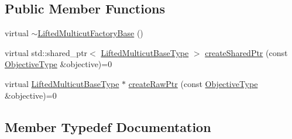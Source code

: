 \subsection*{Public Member Functions}
\begin{DoxyCompactItemize}
\item 
virtual \hyperlink{classnifty_1_1graph_1_1optimization_1_1lifted__multicut_1_1LiftedMulticutFactoryBase_a39b5ed3271c1891e6c959cf0d13b3a44}{$\sim$\+Lifted\+Multicut\+Factory\+Base} ()
\item 
virtual std\+::shared\+\_\+ptr$<$ \hyperlink{classnifty_1_1graph_1_1optimization_1_1lifted__multicut_1_1LiftedMulticutFactoryBase_adbe8507647f54608c03ce04b42742414}{Lifted\+Multicut\+Base\+Type} $>$ \hyperlink{classnifty_1_1graph_1_1optimization_1_1lifted__multicut_1_1LiftedMulticutFactoryBase_a96b3ee71a961471371c92be56d25de16}{create\+Shared\+Ptr} (const \hyperlink{classnifty_1_1graph_1_1optimization_1_1lifted__multicut_1_1LiftedMulticutFactoryBase_a25e776473243feba756c4998e89c35f0}{Objective\+Type} \&objective)=0
\item 
virtual \hyperlink{classnifty_1_1graph_1_1optimization_1_1lifted__multicut_1_1LiftedMulticutFactoryBase_adbe8507647f54608c03ce04b42742414}{Lifted\+Multicut\+Base\+Type} $\ast$ \hyperlink{classnifty_1_1graph_1_1optimization_1_1lifted__multicut_1_1LiftedMulticutFactoryBase_a1b70cc1f6187ea977e0f0bb52e1969b9}{create\+Raw\+Ptr} (const \hyperlink{classnifty_1_1graph_1_1optimization_1_1lifted__multicut_1_1LiftedMulticutFactoryBase_a25e776473243feba756c4998e89c35f0}{Objective\+Type} \&objective)=0
\end{DoxyCompactItemize}


\subsection{Member Typedef Documentation}
\hypertarget{classnifty_1_1graph_1_1optimization_1_1lifted__multicut_1_1LiftedMulticutFactoryBase_adbe8507647f54608c03ce04b42742414}{}
